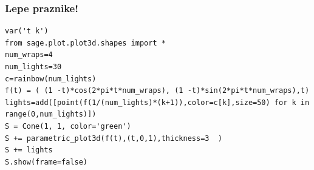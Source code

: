 \subsubsection{Lepe praznike!}

\begin{verbatim}
var('t k')
from sage.plot.plot3d.shapes import *
num_wraps=4
num_lights=30
c=rainbow(num_lights)
f(t) = ( (1 -t)*cos(2*pi*t*num_wraps), (1 -t)*sin(2*pi*t*num_wraps),t)
lights=add([point(f(1/(num_lights)*(k+1)),color=c[k],size=50) for k in range(0,num_lights)])
S = Cone(1, 1, color='green')
S += parametric_plot3d(f(t),(t,0,1),thickness=3  )
S += lights
S.show(frame=false)
\end{verbatim}